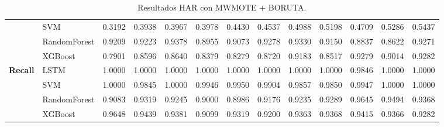 \begin{table}[h]
\begin{adjustbox}{max width=15cm}
\begin{tabular}{|c|l|r|r|r|r|r|r|r|r|r|r|r|}
			& SVM &  0.3192 &  0.3938 &  0.3967 &  0.3978 &  0.4430 &  0.4537 &  0.4988 &  0.5198 &  0.4709 &  0.5286 &  0.5437 \\
			& RandomForest &  0.9209 &  0.9223 &  0.9378 &  0.8955 &  0.9073 &  0.9278 &  0.9330 &  0.9150 &  0.8837 &  0.8622 &  0.9271 \\
			& XGBoost &  0.7901 &  0.8596 &  0.8640 &  0.8379 &  0.8279 &  0.8720 &  0.9183 &  0.8517 &  0.9279 &  0.9014 &  0.9282 \\
			\hline
			\textbf{Recall} & LSTM &  1.0000 &  1.0000 &  1.0000 &  1.0000 &  1.0000 &  1.0000 &  1.0000 &  1.0000 &  0.9846 &  1.0000 &  1.0000 \\
			& SVM &  1.0000 &  0.9845 &  1.0000 &  0.9946 &  0.9950 &  0.9904 &  0.9857 &  0.9850 &  0.9947 &  1.0000 &  1.0000 \\
			& RandomForest &  0.9083 &  0.9319 &  0.9245 &  0.9000 &  0.8986 &  0.9176 &  0.9235 &  0.9289 &  0.9645 &  0.9494 &  0.9368 \\
			& XGBoost &  0.9648 &  0.9439 &  0.9381 &  0.9099 &  0.9319 &  0.9200 &  0.9363 &  0.9368 &  0.9415 &  0.9366 &  0.9282 \\
			\hline
		\end{tabular}
	\end{adjustbox}
	\caption{Resultados HAR con MWMOTE + BORUTA.}
	\label{tab:HAR_MWMOTE_BORUTA}
\end{table}

\newpage

